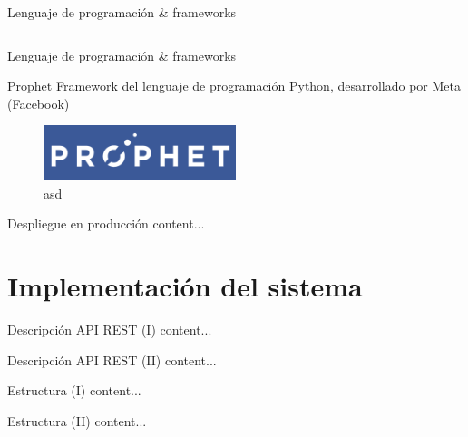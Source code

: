 \documentclass[aspectratio=169,xcolor=dvipsnames]{beamer}
\begin{document}
\begin{frame}{Lenguaje de programación \& frameworks}
\begin{columns}
\begin{column}{0.5\textwidth}
				
			\end{column}
		\end{columns}
	\end{frame}

	\begin{frame}{Lenguaje de programación \& frameworks}
		\begin{exampleblock}{Prophet}
			Framework del lenguaje de programación Python, desarrollado por Meta (Facebook)
			
			\begin{figure}[h!]
				\begin{center}
					\includegraphics[width=0.5\textwidth]{img/prophet_logo.png}
					\caption{asd}
				\end{center}
			\end{figure}
		\end{exampleblock}
	\end{frame}
	
	
	\begin{frame}{Despliegue en producción}
		content...
	\end{frame}
	
	
	\section{Implementación del sistema}
	
	\begin{frame}{Descripción API REST (I)}
		content...
	\end{frame}
	
	
	\begin{frame}{Descripción API REST (II)}
		content...
	\end{frame}
	
	
	\begin{frame}{Estructura (I)}
		content...
	\end{frame}

	\begin{frame}{Estructura (II)}
		content...
	\end{frame}
	
\end{document}
